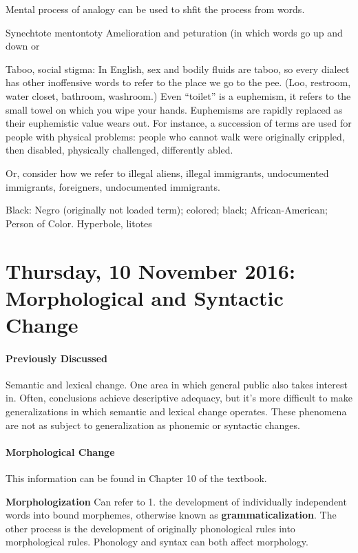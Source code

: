 \documentclass{exam}
\begin{document}
Mental process of analogy can be used to shfit the process from words. 

Synechtote mentontoty
Amelioration and peturation (in which words go up and down or 

Taboo, social stigma: In English, sex and bodily fluids are taboo, so every dialect has other inoffensive words to refer to the place we go to the pee. 
(Loo, restroom, water closet, bathroom, washroom.)
Even ``toilet'' is a euphemism, it refers to the small towel on which you wipe your hands. 
Euphemisms are rapidly replaced as their euphemistic value wears out. 
For instance, a succession of terms are used for people with physical problems: people who cannot walk were originally crippled, then disabled, physically challenged, differently abled. 

Or, consider how we refer to illegal aliens, illegal immigrants, undocumented immigrants, foreigners, undocumented immigrants. 

Black: Negro (originally not loaded term); colored; black; African-American; Person of Color. 
Hyperbole, litotes

\section*{Thursday, 10 November 2016: Morphological and Syntactic Change}

\paragraph{Previously Discussed} Semantic and lexical change. 
One area in which general public also takes interest in. 
Often, conclusions achieve descriptive adequacy, but it's more difficult to make generalizations in which semantic and lexical change operates.
These phenomena are not as subject to generalization as phonemic or syntactic changes. 


\paragraph{Morphological Change} 
This information can be found in Chapter 10 of the textbook. 

\textbf{Morphologization} Can refer to 1. the development of individually independent words into bound morphemes, otherwise known as \textbf{grammaticalization}. The other process is the development of originally phonological rules into morphological rules. 
Phonology and syntax can both affect morphology. 
\end{document}
